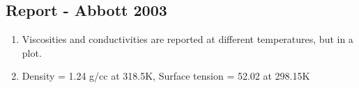 \documentclass[11pt]{article}
\begin{document}
\subsection{Report - Abbott 2003 \cite{Abbott2003}}
\begin{enumerate}
\item Viscosities and conductivities are reported at different temperatures, but in a plot.
\item Density = 1.24 g/cc at 318.5K, Surface tension = 52.02 at 298.15K
\end{enumerate}


\end{document}
